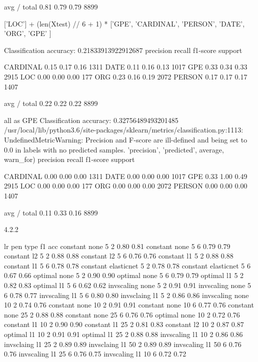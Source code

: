 \documentclass[11pt]{article}
\begin{document}
avg / total       0.81      0.79      0.79      8899

['LOC'] + (len(Xtest) // 6 + 1) * ['GPE', 'CARDINAL', 'PERSON', 'DATE', 'ORG', 'GPE' ]

Classification accuracy: 0.21833913922912687
             precision    recall  f1-score   support

   CARDINAL       0.15      0.17      0.16      1311
       DATE       0.11      0.16      0.13      1017
        GPE       0.33      0.34      0.33      2915
        LOC       0.00      0.00      0.00       177
        ORG       0.23      0.16      0.19      2072
     PERSON       0.17      0.17      0.17      1407

avg / total       0.22      0.22      0.22      8899

all as GPE
Classification accuracy: 0.32756489493201485
/usr/local/lib/python3.6/site-packages/sklearn/metrics/classification.py:1113: UndefinedMetricWarning: Precision and F-score are ill-defined and being set to 0.0 in labels with no predicted samples.
  'precision', 'predicted', average, warn_for)
             precision    recall  f1-score   support

   CARDINAL       0.00      0.00      0.00      1311
       DATE       0.00      0.00      0.00      1017
        GPE       0.33      1.00      0.49      2915
        LOC       0.00      0.00      0.00       177
        ORG       0.00      0.00      0.00      2072
     PERSON       0.00      0.00      0.00      1407

avg / total       0.11      0.33      0.16      8899

4.2.2

lr      pen   type  f1  acc
constant    none        5   2     0.80  0.81
constant    none        5   6     0.79  0.79
constant    l2          5   2     0.88  0.88
constant    l2          5   6     0.76  0.76
constant    l1          5   2     0.88  0.88
constant    l1          5   6     0.78  0.78
constant    elasticnet  5   2     0.78  0.78
constant    elasticnet  5   6     0.67  0.66
optimal     none        5   2     0.90  0.90
optimal     none        5   6     0.79  0.79
optimal     l1          5   2     0.82  0.83
optimal     l1          5   6     0.62  0.62
invscaling  none        5   2     0.91  0.91
invscaling  none        5   6     0.78  0.77
invscaling  l1          5   6     0.80  0.80
invsclaing  l1          5   2     0.86  0.86
invscaling  none        10  2     0.74  0.76
constant    none        10  2     0.91  0.91
constant    none        10  6     0.77  0.76
constant    none        25  2     0.88  0.88
constant    none        25  6     0.76  0.76
optimal     none        10  2     0.72  0.76
constant    l1          10  2     0.90  0.90
constant    l1          25  2     0.81  0.83
constant    l2          10  2     0.87  0.87
optimal     l1          10  2     0.91  0.91
optimal     l1          25  2     0.88  0.88
invscaling  l1          10  2     0.86  0.86
invsclaing  l1          25  2     0.89  0.89
invsclaing  l1          50  2     0.89  0.89
invscaling  l1          50  6     0.76  0.76
invscaling  l1          25  6     0.76  0.75
invscaling  l1          10  6     0.72  0.72
\end{document}
